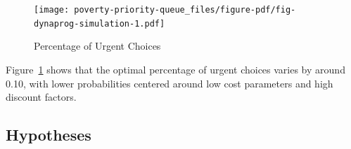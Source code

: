 \documentclass[
]{article}
\begin{document}
\begin{figure}

{\centering \texttt{[image: poverty-priority-queue\_files/figure-pdf/fig-dynaprog-simulation-1.pdf]}

}

\caption{\label{fig-dynaprog-simulation}Percentage of Urgent Choices}

\end{figure}

Figure~\ref{fig-dynaprog-simulation} shows that the optimal percentage
of urgent choices varies by around 0.10, with lower probabilities
centered around low cost parameters and high discount factors.

\hypertarget{hypotheses}{%
\subsection{Hypotheses}\label{hypotheses}}
\end{document}
